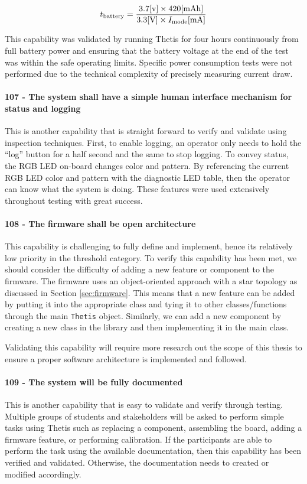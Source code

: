 \begin{equation} \labeq{battery_life}
    t_{\text{battery}} = \frac{3.7 [\text{v}] \times 420 [\text{mAh}]}{3.3 [\text{V}] \times I_{\text{mode}} [\text{mA}]}
\end{equation}

This capability was validated by running Thetis for four hours continuously from full battery power and ensuring that the battery voltage at the end of the test was within the safe operating limits.
Specific power consumption tests were not performed due to the technical complexity of precisely measuring current draw.

\paragraph*{107 - The system shall have a simple human interface mechanism for status and logging} This is another capability that is straight forward to verify and validate using inspection techniques.
First, to enable logging, an operator only needs to hold the ``log'' button for a half second and the same to stop logging.
To convey status, the RGB LED on-board changes color and pattern.
By referencing the current RGB LED color and pattern with the diagnostic LED table, then the operator can know what the system is doing.
These features were used extensively throughout testing with great success.

\paragraph*{108 - The firmware shall be open architecture} This capability is challenging to fully define and implement, hence its relatively low priority in the threshold category.
To verify this capability has been met, we should consider the difficulty of adding a new feature or component to the firmware.
The firmware uses an object-oriented approach with a star topology as discussed in Section \ref{sec:firmware}.
This means that a new feature can be added by putting it into the appropriate class and tying it to other classes/functions through the main \lstinline[style=customInline]|Thetis| object.
Similarly, we can add a new component by creating a new class in the library and then implementing it in the main class.

Validating this capability will require more research out the scope of this thesis to ensure a proper software architecture is implemented and followed.

\paragraph*{109 - The system will be fully documented} This is another capability that is easy to validate and verify through testing.
Multiple groups of students and stakeholders will be asked to perform simple tasks using Thetis such as replacing a component, assembling the board, adding a firmware feature, or performing calibration.
If the participants are able to perform the task using the available documentation, then this capability has been verified and validated.
Otherwise, the documentation needs to created or modified accordingly.

